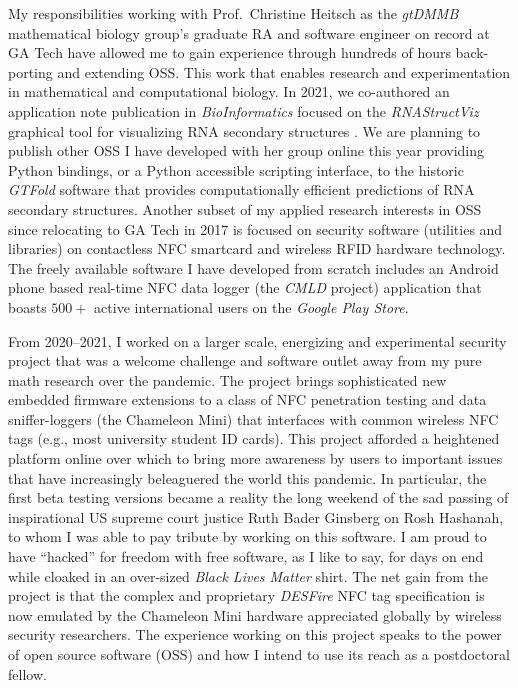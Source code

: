 \documentclass[10pt,reqno,letterpaper]{article}
\theoremstyle{plain}
\numberwithin{theorem}{section}
\theoremstyle{definition}
\begin{document}
My responsibilities working with 
Prof.~Christine Heitsch as the \emph{gtDMMB} mathematical biology group's graduate RA and 
software engineer on record at GA Tech have allowed me to gain experience through 
hundreds of hours back-porting and extending OSS. This work that enables research and experimentation 
in mathematical and computational biology. 
In 2021, we co-authored an application note publication in \emph{BioInformatics} 
focused on the \emph{RNAStructViz} graphical tool for visualizing RNA secondary structures 
\cite{MDS-NO-21}. 
We are planning to publish other OSS I have developed with her group online this year providing 
Python bindings, or a Python accessible scripting interface, to the historic \emph{GTFold} software 
\cite{GTFOLD-PUB-REFERENCE} 
that provides computationally efficient predictions of RNA secondary structures. 
Another subset of my applied research interests in OSS since relocating to GA Tech in 2017 
is focused on security software (utilities and libraries) on contactless NFC smartcard and wireless RFID 
hardware technology. 
The freely available software I have developed from scratch includes an 
Android phone based real-time NFC data logger (the \emph{CMLD} project)
application that boasts $500+$ active international users on the 
\emph{Google Play Store}. 

From 2020--2021, I worked on a larger scale, energizing and experimental 
security project that was a welcome challenge and software outlet away 
from my pure math research over the pandemic. 
The project brings sophisticated new 
embedded firmware extensions to a class of NFC penetration testing and 
data sniffer-loggers 
(the Chameleon Mini) that interfaces with common wireless NFC tags (e.g., most university student ID cards). 
This project afforded a heightened platform online 
over which to bring 
more awareness by users to important issues 
that have increasingly beleaguered the world this pandemic. 
In particular, the first beta testing versions became a reality 
the long weekend of the sad passing of inspirational 
US supreme court justice Ruth Bader Ginsberg on 
Rosh Hashanah, to whom I was able to pay tribute by working on this software. 
I am proud to have ``hacked'' for freedom with free software, as I like to say, for days on end 
while cloaked in an over-sized \emph{Black Lives Matter} shirt. 
The net gain from the project is that the complex and proprietary \emph{DESFire} NFC tag
specification is now emulated by the Chameleon Mini hardware appreciated globally by 
wireless security researchers.  
The experience working on this project speaks to the power of 
open source software (OSS) and how I intend to use its reach as a postdoctoral fellow.
\end{document}
